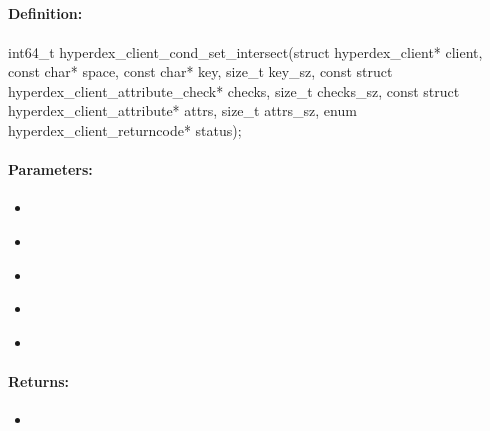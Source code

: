\pagebreak
\subsection{}
\label{api:c:cond_set_intersect}


\paragraph{Definition:}
\begin{ccode}
int64_t hyperdex_client_cond_set_intersect(struct hyperdex_client* client,
        const char* space,
        const char* key, size_t key_sz,
        const struct hyperdex_client_attribute_check* checks, size_t checks_sz,
        const struct hyperdex_client_attribute* attrs, size_t attrs_sz,
        enum hyperdex_client_returncode* status);
\end{ccode}

\paragraph{Parameters:}
\begin{itemize}[noitemsep]
\item {}\\

\item {}\\

\item {}\\

\item {}\\

\item {}\\

\end{itemize}

\paragraph{Returns:}
\begin{itemize}[noitemsep]
\item {}\\

\end{itemize}

